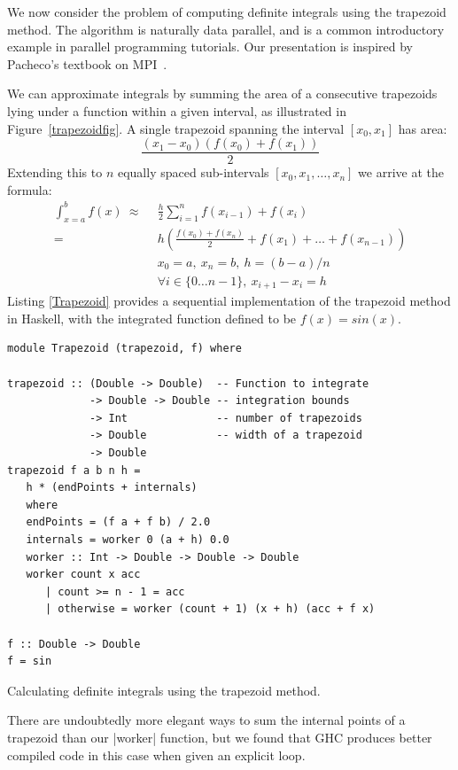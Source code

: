 \documentclass{tmr}
\begin{document}
We now consider the problem of computing definite integrals
using the trapezoid method. The algorithm is naturally data parallel, and is a common
introductory example in parallel programming tutorials. Our presentation is inspired by
Pacheco's textbook on MPI~\cite{Pacheco}.

We can approximate integrals by summing the area of a consecutive
trapezoids lying under a function within a given interval, as illustrated in
Figure~\ref{trapezoidfig}. A single trapezoid spanning the interval
$[x_0,x_1]$ has area:
\begin{equation*}
\frac{(x_1 - x_0)(f(x_0) + f(x_1))}{2}
\end{equation*}
Extending this to $n$ equally spaced sub-intervals $[x_0,x_1,\ldots,x_n]$ we arrive at the formula:
\begin{equation*}
\begin{split}
\int_{x=a}^{b} f(x)\ \approx\ &\ \frac{h}{2} \sum_{i=1}^n f(x_{i-1}) + f(x_i) \\[3mm]
                     =\  &\ h \left(\frac{f(x_0) + f(x_n)}{2} + f(x_1) + \ldots + f(x_{n-1})\right) \\[3mm]
                     &\ x_0 = a,\ x_n = b,\ h = (b - a)/n\\
                     &\ \forall i \in \{0 \ldots n-1\},\ x_{i+1} - x_{i} = h
\end{split}
\end{equation*}
Listing \ref{Trapezoid} provides a sequential implementation of the trapezoid method in Haskell, with
the integrated function defined to be
$f(x) = sin(x)$.

\begin{listing}
\begin{Verbatim}
module Trapezoid (trapezoid, f) where

trapezoid :: (Double -> Double)  -- Function to integrate
             -> Double -> Double -- integration bounds
             -> Int              -- number of trapezoids
             -> Double           -- width of a trapezoid
             -> Double
trapezoid f a b n h =
   h * (endPoints + internals)
   where
   endPoints = (f a + f b) / 2.0
   internals = worker 0 (a + h) 0.0
   worker :: Int -> Double -> Double -> Double
   worker count x acc
      | count >= n - 1 = acc
      | otherwise = worker (count + 1) (x + h) (acc + f x)

f :: Double -> Double
f = sin
\end{Verbatim}
\caption{Calculating definite integrals using the trapezoid method. \label{Trapezoid}}
\end{listing}
There are undoubtedly more elegant ways to sum the internal points of a trapezoid
than our |worker| function, but we found that GHC produces better compiled code
in this case when given an explicit loop.
\end{document}
